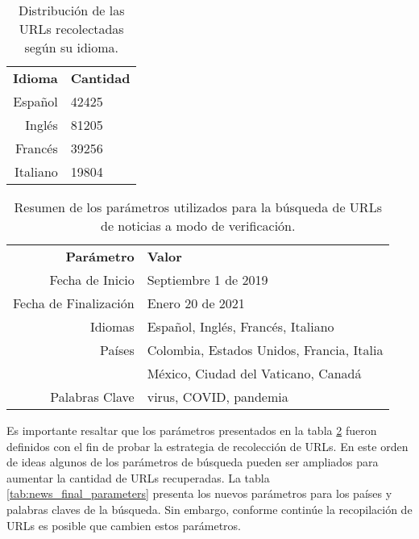 \begin{table}[h]
    \centering
    \begin{tabular}{r|l}
        \textbf{Idioma} & \textbf{Cantidad} \\
        Español & 42425 \\
        Inglés & 81205 \\
        Francés & 39256 \\
        Italiano & 19804
        
    \end{tabular}
    \caption{Distribución de las URLs recolectadas según su idioma.}
    \label{tab:news_results}
\end{table}

\begin{table}[h]
    \centering
    \begin{tabular}{r|l}
        \textbf{Parámetro} & \textbf{Valor} \\
        Fecha de Inicio & Septiembre 1 de 2019 \\
        Fecha de Finalización & Enero 20 de 2021 \\
        Idiomas & Español, Inglés, Francés, Italiano \\
        Países & Colombia, Estados Unidos, Francia, Italia \\
        & México, Ciudad del Vaticano, Canadá \\
        Palabras Clave & virus, COVID, pandemia
    \end{tabular}
    \caption{Resumen de los parámetros utilizados para la búsqueda de URLs de noticias a modo de verificación.}
    \label{tab:news_parameters}
\end{table}

Es importante resaltar que los parámetros presentados en la tabla \ref{tab:news_parameters} fueron definidos con el fin de probar la estrategia de recolección de URLs. En este orden de ideas algunos de los parámetros de búsqueda pueden ser ampliados para aumentar la cantidad de URLs recuperadas. La tabla \ref{tab:news_final_parameters} presenta los nuevos parámetros para los países y palabras claves de la búsqueda. Sin embargo, conforme continúe la recopilación de URLs es posible que cambien estos parámetros.

